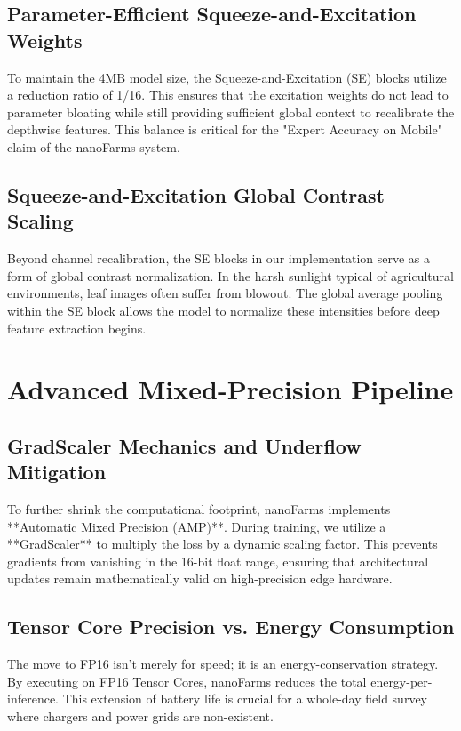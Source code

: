 \documentclass[11pt,onecolumn]{article}
\begin{document}
\subsection{Parameter-Efficient Squeeze-and-Excitation Weights}
To maintain the 4MB model size, the Squeeze-and-Excitation (SE) blocks utilize a reduction ratio of 1/16. This ensures that the excitation weights do not lead to parameter bloating while still providing sufficient global context to recalibrate the depthwise features. This balance is critical for the "Expert Accuracy on Mobile" claim of the nanoFarms system.

\subsection{Squeeze-and-Excitation Global Contrast Scaling}
Beyond channel recalibration, the SE blocks in our implementation serve as a form of global contrast normalization. In the harsh sunlight typical of agricultural environments, leaf images often suffer from blowout. The global average pooling within the SE block allows the model to normalize these intensities before deep feature extraction begins.

\section{Advanced Mixed-Precision Pipeline}

\subsection{GradScaler Mechanics and Underflow Mitigation}
To further shrink the computational footprint, nanoFarms implements **Automatic Mixed Precision (AMP)**. During training, we utilize a **GradScaler** to multiply the loss by a dynamic scaling factor. This prevents gradients from vanishing in the 16-bit float range, ensuring that architectural updates remain mathematically valid on high-precision edge hardware.

\subsection{Tensor Core Precision vs. Energy Consumption}
The move to FP16 isn't merely for speed; it is an energy-conservation strategy. By executing on FP16 Tensor Cores, nanoFarms reduces the total energy-per-inference. This extension of battery life is crucial for a whole-day field survey where chargers and power grids are non-existent.
\end{document}
